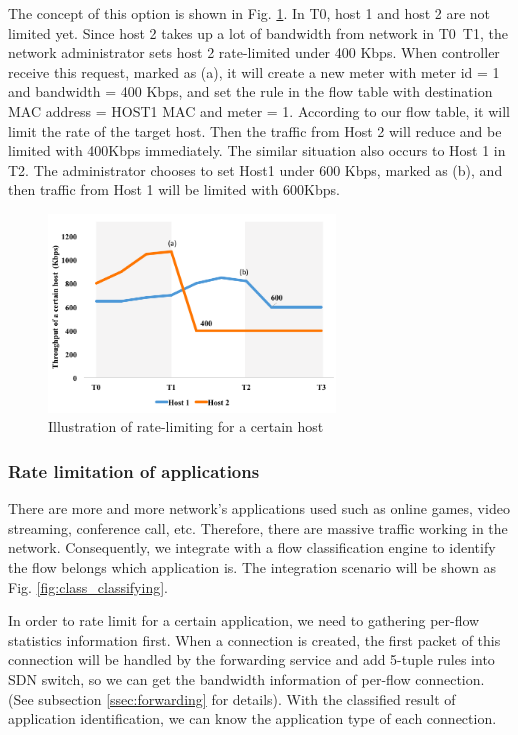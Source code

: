 \documentclass[journal]{IEEEtran}
\begin{document}
The concept of this option is shown in Fig. \ref{fig:mft_qos_rate_host}. In T0, host 1 and host 2 are not limited yet. Since host 2 takes up a lot of bandwidth from network in T0~T1, the network administrator sets host 2 rate-limited under 400 Kbps. When controller receive this request, marked as (a), it will create a new meter  with meter id = 1 and bandwidth = 400 Kbps, and set the rule in the flow table with destination MAC address = HOST1 MAC and meter = 1. According to our flow table, it will limit the rate of the target host. Then the traffic from Host 2 will reduce and be limited with 400Kbps immediately. The similar situation also occurs to Host 1 in T2. The administrator chooses to set Host1 under 600 Kbps, marked as (b), and then traffic from Host 1 will be limited with 600Kbps.


\begin{figure}[!t]
\centering
\includegraphics[width=3in]{./figures/mft_qos_rate_host}
\caption{Illustration of rate-limiting for a certain host}
\label{fig:mft_qos_rate_host}
\end{figure}


\subsubsection{Rate limitation of applications}
There are more and more network’s applications used such as online games, video streaming, conference call, etc. Therefore, there are massive traffic working in the network. Consequently, we integrate with a flow classification engine to identify the flow belongs which application is. The integration scenario will be shown as Fig. \ref{fig:class_classifying}.


In order to rate limit for a certain application, we need to gathering per-flow statistics information first. When
a connection is created, the first packet of this connection will be handled by the forwarding service and add 5-tuple rules into SDN switch, so we can get the bandwidth information of per-flow connection. (See subsection \ref{ssec:forwarding} for details). With the classified result of application identification, we can know the application type of each connection.
\end{document}
